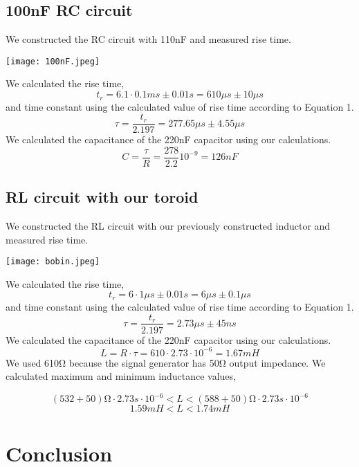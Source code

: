 \documentclass{article}
\begin{document}
\newpage
\subsection{100nF RC circuit}
We constructed the RC circuit with 110nF and measured rise time.

\begin{center}
    \texttt{[image: 100nF.jpeg]}
    \label{fig:centered-figure}
\end{center}

We calculated the rise time,
\[t_r = 6.1 \cdot 0.1ms \pm 0.01s = 610\mu s \pm 10\mu s\]
and time constant using the calculated value of rise time according to Equation 1.
\[\tau = \frac{t_r}{2.197} = 277.65\mu s \pm 4.55\mu s \]
We calculated the capacitance of the 220nF capacitor using our calculations.
\[C = \frac{\tau}{R} = \frac{278}{2.2}10^{-9} = 126nF\]

\newpage
\subsection{RL circuit with our toroid}
We constructed the RL circuit with our previously constructed inductor and measured rise time.

\begin{center}
    \texttt{[image: bobin.jpeg]}
    \label{fig:centered-figure}
\end{center}

We calculated the rise time,
\[t_r = 6 \cdot 1\mu s \pm 0.01s = 6\mu s \pm 0.1\mu s\]
and time constant using the calculated value of rise time according to Equation 1.
\[\tau = \frac{t_r}{2.197} = 2.73\mu s \pm 45ns \]
We calculated the capacitance of the 220nF capacitor using our calculations.
\[L = R \cdot \tau = 610 \cdot 2.73 \cdot 10^{-6} = 1.67mH\]
We used 610\si{\ohm} because the signal generator has 50\si{\ohm} output impedance.
We calculated maximum and minimum inductance values,

\[(532 + 50)\si{\ohm} \cdot 2.73s \cdot 10^{-6} < L < (588 + 50)\si{\ohm} \cdot 2.73s \cdot 10^{-6} \]
\[1.59mH < L < 1.74mH\]

\newpage
\section{Conclusion}
\end{document}

